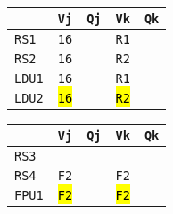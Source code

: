 \begin{enumerate}
    \begin{minipage}{0.45\textwidth}
        \centering
        \begin{tabular}{@{} l | l l l l @{}}
            \toprule
                & \texttt{Vj} & \texttt{Qj} & \texttt{Vk} & \texttt{Qk} \\
            \midrule
            \texttt{RS1} & \texttt{16} & & \texttt{R1} & \\ [.3em]
            \texttt{RS2} & \texttt{16} & & \texttt{R2} & \\
            \cmidrule{1-5}
            \texttt{LDU1} & \texttt{16} & & \texttt{R1} & \\ [.3em]
            \texttt{LDU2} & \hl{\texttt{16}} & & \hl{\texttt{R2}} & \\
            \bottomrule
        \end{tabular}
    \end{minipage}
    \hfill
    \begin{minipage}{0.45\textwidth}
        \centering
        \begin{tabular}{@{} l | l l l l @{}}
            \toprule
            & \texttt{Vj} & \texttt{Qj} & \texttt{Vk} & \texttt{Qk} \\
            \midrule
            \texttt{RS3} & & & & \\ [.3em]
            \texttt{RS4} & \texttt{F2} & & \texttt{F2} & \\
            \cmidrule{1-5}
            \texttt{FPU1} & \hl{\texttt{F2}} & & \hl{\texttt{F2}} & \\
            \bottomrule
        \end{tabular}
    \end{minipage}


\end{enumerate}
